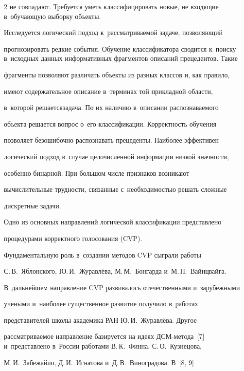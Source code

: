 \begin{multicols}{2}
не совпадают. Требуется уметь классифицировать новые, не входящие в~обуча\-ющую выборку объекты. 


  


  Исследуется логический подход к~рассматриваемой задаче, позволяющий 


прогнозировать редкие события. Обучение классификатора сводится к~поиску в~исходных данных информативных фрагментов описаний прецедентов. Такие 


фрагменты позволяют различать объекты из разных классов и, как правило, 


имеют содержательное описание в~терминах той прикладной об\-ласти, 


в~которой решается\linebreak задача. По их наличию в~описании рас\-по\-зна\-ва\-емо\-го 


объекта решается вопрос о~его классификации. Кор\-рект\-ность обуче\-ния 


поз\-во\-ля\-ет без\-оши\-боч\-но распознавать прецеденты. Наиболее \mbox{эффективен} 


логический подход в~случае це\-ло\-чис\-лен\-ной информации низкой знач\-ности, 


особенно бинарной. При большом чис\-ле признаков возникают 


вы\-чис\-ли\-тель\-ные трудности, связанные с~не\-об\-хо\-ди\-мостью решать сложные 


дискретные задачи.


  


  Одно из основных направлений логической классификации представлено 


процедурами корректного голосования (CVP). 


Фундаментальную роль в~создании методов CVP сыграли работы 


С.\,В.~Яблонского, Ю.\,И.~Журавлёва, М.\,М.~Бонгарда и~М.\,Н.~Вайнцвайга. 


В~дальнейшем направление CVP развивалось отечественными и~зарубежными 


учеными и~наиболее существенное развитие получило в~работах 


представителей школы академика РАН Ю.\,И.~Журавлёва. Другое 


рас\-смат\-ри\-ва\-емое на\-прав\-ле\-ние базируется на идеях ДСМ-ме\-то\-да~[7] и~пред\-став\-ле\-но в~России работами В.\,К.~Финна, С.\,О.~Кузнецова, 


М.\,И.~Забежайло, Д.\,И.~Игнатова и~Д.\,В.~Виноградова. В~[8, 9] 



\end{multicols}
